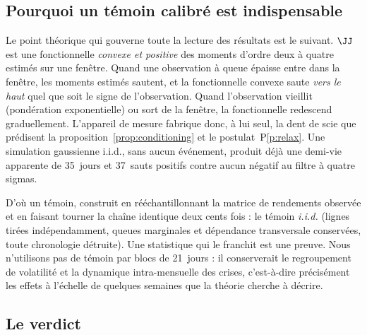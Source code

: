 \subsection{Pourquoi un témoin calibré est indispensable}

Le point théorique qui gouverne toute la lecture des résultats est le suivant.
$\JJ$ est une fonctionnelle \emph{convexe et positive} des moments d'ordre deux à
quatre estimés sur une fenêtre. Quand une observation à queue épaisse entre dans
la fenêtre, les moments estimés sautent, et la fonctionnelle convexe saute
\emph{vers le haut} quel que soit le signe de l'observation. Quand
l'observation vieillit (pondération exponentielle) ou sort de la fenêtre, la
fonctionnelle redescend graduellement. L'appareil de mesure fabrique donc, à
lui seul, la dent de scie que prédisent la proposition~\ref{prop:conditioning}
et le postulat~P\ref{p:relax}. Une simulation gaussienne i.i.d., sans aucun
événement, produit déjà une demi-vie apparente de 35~jours et 37~sauts positifs
contre aucun négatif au filtre à quatre sigmas.

D'où un témoin, construit en rééchantillonnant la matrice de rendements
observée et en faisant tourner la chaîne identique deux cents fois : le témoin
\emph{i.i.d.} (lignes tirées indépendamment, queues marginales et dépendance
transversale conservées, toute chronologie détruite). Une statistique qui le
franchit est une preuve. Nous n'utilisons pas de témoin par blocs de
21~jours : il conserverait le regroupement de volatilité et la dynamique
intra-mensuelle des crises, c'est-à-dire précisément les effets à l'échelle de
quelques semaines que la théorie cherche à décrire.

\subsection{Le verdict}

